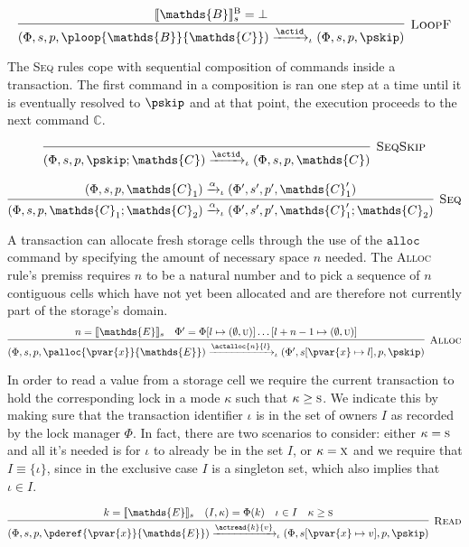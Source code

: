 \[
\infer[\textsc{LoopF}]
{
	(\Phi, s, p, \ploop{\mathds{B}}{\mathds{C}})
	\xrightarrow{\actid}_\iota
	(\Phi, s, p, \pskip)
}
{
	\llbracket \mathds{B} \rrbracket_s^\textsc{B} = \bot
}
\]

The \textsc{Seq} rules cope with sequential composition of commands inside a transaction. The first command in a composition is ran one step at a time until it is eventually resolved to $\pskip$ and at that point, the execution proceeds to the next command $\mathds{C}$.

\[
\infer[\textsc{SeqSkip}]
{
	(\Phi, s, p, \pskip ; \mathds{C})
	\xrightarrow{\actid}_\iota
	(\Phi, s, p, \mathds{C})
}
{}
\]

\[
\infer[\textsc{Seq}]
{
	(\Phi, s, p, \mathds{C}_1 ; \mathds{C}_2)
	\xrightarrow{\alpha}_\iota
	(\Phi', s', p', \mathds{C}_1' ; \mathds{C}_2)
}
{
	(\Phi, s, p, \mathds{C}_1)
	\xrightarrow{\alpha}_\iota
	(\Phi', s', p', \mathds{C}_1')
}
\]

A transaction can allocate fresh storage cells through the use of the $\mathtt{alloc}$ command by specifying the amount of necessary space $n$ needed. The \textsc{Alloc} rule's premiss requires $n$ to be a natural number and to pick a sequence of $n$ contiguous cells which have not yet been allocated and are therefore not currently part of the storage's domain.
\[
\infer[\textsc{Alloc}]
{
	(\Phi, s, p, \palloc{\pvar{x}}{\mathds{E}})
	\xrightarrow{\actalloc{n}{l}}_\iota
	(\Phi', s[\pvar{x} \mapsto l], p, \pskip)
}
{
	n = \llbracket \mathds{E} \rrbracket_s &
	\Phi' = \Phi[l \mapsto (\emptyset, \textsc{u})]\ldots[l + n - 1 \mapsto (\emptyset, \textsc{u})]
}
\]

In order to read a value from a storage cell we require the current transaction to hold the corresponding lock in a mode $\kappa$ such that $\kappa \geq \textsc{s}$. We indicate this by making sure that the transaction identifier $\iota$ is in the set of owners $I$ as recorded by the lock manager $\Phi$. In fact, there are two scenarios to consider: either $\kappa = \textsc{s}$ and all it's needed is for $\iota$ to already be in the set $I$, or $\kappa = \textsc{x}$ and we require that $I \equiv \{ \iota \}$, since in the exclusive case $I$ is a singleton set, which also implies that $\iota \in I$.

\[
\infer[\textsc{Read}]
{
	(\Phi, s, p, \pderef{\pvar{x}}{\mathds{E}})
	\xrightarrow{\actread{k}{v}}_\iota
	(\Phi, s[\pvar{x} \mapsto v], p, \pskip)
}
{
	k = \llbracket \mathds{E} \rrbracket_s &
	(I, \kappa) = \Phi(k) &
	\iota \in I &
	\kappa \geq \textsc{s}
}
\]

